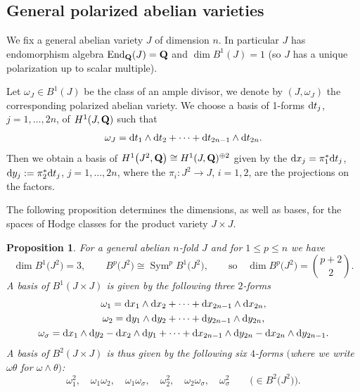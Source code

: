 \documentclass[pdftex]{sigma}
\numberwithin{equation}{section}
\newtheorem{Proposition}[Theorem]{Proposition}
 { \theoremstyle{definition}
\newtheorem{Definition}[Theorem]{Definition}
\newtheorem{Note}[Theorem]{Note}
\newtheorem{Example}[Theorem]{Example}
\newtheorem{Remark}[Theorem]{Remark} }
\begin{document}
\subsection{General polarized abelian varieties}\label{JJ}
We fix a general abelian variety $J$ of dimension $n$. In particular $J$ has
endomorphism algebra $\operatorname{End}_{\bf Q}(J)={\bf Q}$ and $\dim B^1(J)=1$ (so $J$
has a unique polarization up to scalar multiple).

Let $\omega_J\in B^1(J)$ be the class of an ample divisor, we denote
by $(J,\omega_J)$ the corresponding polarized abelian variety.
We choose a basis of 1-forms ${\rm d} t_j$, $j=1,\dots,2n$, of $H^1(J,{\bf Q})$ such that
\[
\omega_J={\rm d} t_1\wedge{\rm d} t_2+ \dots + {\rm d} t_{2n-1}\wedge {\rm d} t_{2n}.
\]
Then we obtain a basis of
$H^1\big(J^2,{\bf Q}\big)\cong H^1(J,{\bf Q})^{\oplus 2}$ given by the
${\rm d} x_j=\pi_1^*{\rm d} t_j$, ${\rm d} y_j:=\pi_2^*{\rm d} t_j$, $j=1,\dots,2n$, where the
$\pi_i\colon J^2 \rightarrow J$, $i=1,2$, are the projections on the factors.

The following proposition determines the dimensions, as well as bases, for the spaces of
Hodge classes for the product variety $J\times J$.

\begin{Proposition} \label{B2}
For a general abelian $n$-fold $J$ and for $1\leq p\leq n$ we have
\[
\dim B^1\big(J^2\big) = 3,\qquad B^p\big(J^2\big) \cong \operatorname{Sym}^pB^1\big(J^2\big),
\qquad \text{so}\quad\dim B^{p}\big(J^2\big) = \binom{p+2}{2}.
\]
A basis of $B^1(J\times J)$ is given by the following three $2$-forms
\begin{gather*}
\omega_1={\rm d} x_1\wedge{\rm d} x_2 + \dots + {\rm d} x_{2n-1}\wedge {\rm d} x_{2n},\\
\omega_2={\rm d} y_1\wedge{\rm d} y_2 + \dots + {\rm d} y_{2n-1}\wedge {\rm d} y_{2n},\\
\omega_\sigma={\rm d} x_1\wedge{\rm d} y_2 - {\rm d} x_2\wedge {\rm d} y_1 + \dots +
 {\rm d} x_{2n-1}\wedge{\rm d} y_{2n}-{\rm d} x_{2n}\wedge {\rm d} y_{2n-1}.
\end{gather*}
A basis of $B^2(J\times J)$ is thus given by the following six $4$-forms
$($where we write $\omega\theta$ for $\omega\wedge\theta)$:
\[
\omega_1^2, \quad\omega_1\omega_2, \quad
\omega_1\omega_\sigma,\quad
\omega_2^2,\quad
\omega_2\omega_\sigma,\quad \omega_\sigma^2\qquad
\big(\!\!\in B^2\big(J^2\big)\big).
\]
\end{Proposition}
\end{document}
